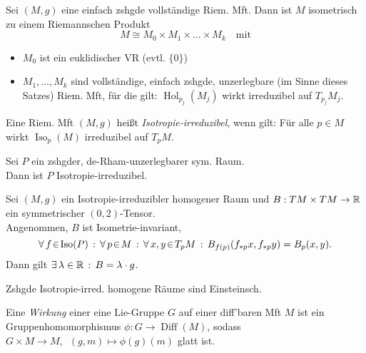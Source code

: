 \documentclass{cheat-sheet}
\DeclareMathOperator{\Iso}{Iso} %
\DeclareMathOperator{\Hol}{Hol} %
\DeclareMathOperator{\Diff}{Diff}
\begin{document}
\begin{satz}[de Rham]
  Sei $(M, g)$ eine einfach zshgde vollständige Riem. Mft. Dann ist $M$ isometrisch zu einem Riemannschen Produkt
  \[ M \cong M_0 \times M_1 \times \ldots \times M_k \quad \text{mit} \]
  \begin{itemize}
    \item $M_0$ ist ein euklidischer VR (evtl. $\{ 0 \}$)
    \item $M_1, \ldots, M_k$ sind vollständige, einfach zshgde, unzerlegbare (im Sinne dieses Satzes) Riem. Mft, für die gilt:
    $\Hol_{p_j}(M_j)$ wirkt irreduzibel auf $T_{p_j} M_j$.
  \end{itemize}
\end{satz}

\begin{defn}
  Eine Riem. Mft $(M, g)$ heißt \emph{Isotropie-irreduzibel}, wenn gilt:
  Für alle $p \in M$ wirkt $\Iso_p(M)$ irreduzibel auf $T_p M$.
\end{defn}

\begin{satz}
  Sei $P$ ein zshgder, de-Rham-unzerlegbarer sym. Raum. \\
  Dann ist $P$ Isotropie-irreduzibel.
\end{satz}

\begin{lem}
  Sei $(M, g)$ ein Isotropie-irreduzibler homogener Raum und $B : TM \times TM \to \mathbb{R}$ ein symmetrischer $(0,2)$-Tensor. \\
  Angenommen, $B$ ist Isometrie-invariant, \dh{}
  \[ \fa{f \!\in\! \Iso(P)} \fa{p \!\in\! M} \fa{x, y \!\in\! T_p M} B_{f(p)}(f_{*p}x, f_{*p}y) = B_p(x, y). \]
  Dann gilt $\exists \, {\lambda \in \mathbb{R}} \,:\, B = \lambda \cdot g$.
\end{lem}

\begin{satz}
  Zshgde Isotropie-irred. homogene Räume sind Einsteinsch.
\end{satz}



\begin{defn}
  Eine \emph{Wirkung} einer eine Lie-Gruppe $G$ auf einer diff'baren Mft $M$ ist ein Gruppenhomomorphismus $\phi : G \to \Diff(M)$, sodass $G \times M \to M, \enspace (g, m) \mapsto \phi(g)(m)$ glatt ist.
\end{defn}
\end{document}
